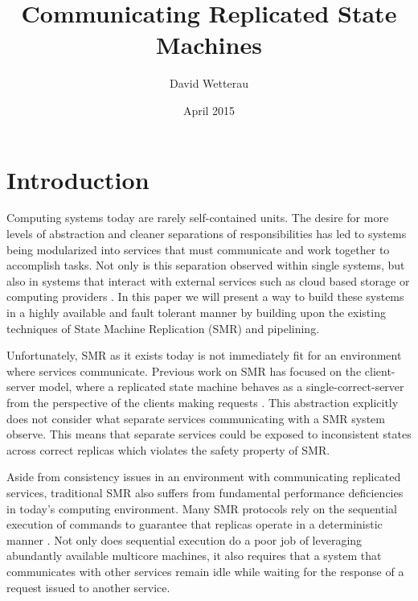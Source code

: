 \documentclass[11pt, oneside]{report}
\title{Communicating Replicated State Machines}
\author{David Wetterau}
\date{April 2015}
\begin{document}
\maketitle

\tableofcontents

\onehalfspacing

\chapter{Introduction}\label{Introduction}
Computing systems today are rarely self-contained units. 
The desire for more levels of abstraction and cleaner separations of responsibilities has led to systems being modularized into services that must communicate and work together to accomplish tasks. 
Not only is this separation observed within single systems, but also in systems that interact with external services such as cloud based storage or computing providers \cite{tao, spanner, dynamo}. 
In this paper we will present a way to build these systems in a highly available and fault tolerant manner by building upon the existing techniques of State Machine Replication (SMR) \cite{practicalBFT, hq, zyz, paxos, paxosMadeSimple, schneider} and pipelining.

Unfortunately, SMR as it exists today is not immediately fit for an environment where services communicate. 
Previous work on SMR has focused on the client-server model, where a replicated state machine behaves as a single-correct-server from the perspective of the clients making requests \cite{schneider}.
This abstraction explicitly does not consider what separate services communicating with a SMR system observe. This means that separate services could be exposed to inconsistent states across correct replicas which violates the safety property of SMR.


Aside from consistency issues in an environment with communicating replicated services, traditional SMR also suffers from fundamental performance deficiencies in today's computing environment. 
Many SMR protocols rely on the sequential execution of commands to guarantee that replicas operate in a deterministic manner \cite{practicalBFT, upRight, hq, paxos}. 
Not only does sequential execution do a poor job of leveraging abundantly available multicore machines, it also requires that a system that communicates with other services remain idle while waiting for the response of a request issued to another service.
\end{document}
